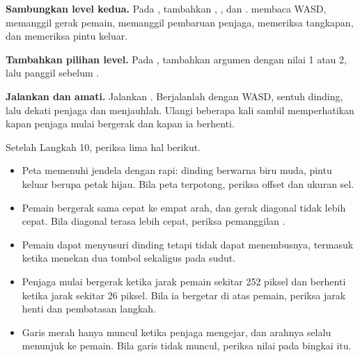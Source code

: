 \begin{langkah}
  \item \textbf{Sambungkan level kedua.} Pada , tambahkan
        , , dan .
         membaca WASD, memanggil gerak pemain, memanggil
        pembaruan penjaga, memeriksa tangkapan, dan memeriksa pintu keluar.

  \item \textbf{Tambahkan pilihan level.} Pada , tambahkan
        argumen  dengan nilai 1 atau 2, lalu panggil
         sebelum .

  \item \textbf{Jalankan dan amati.} Jalankan
        . Berjalanlah dengan WASD, sentuh dinding,
        lalu dekati penjaga dan menjauhlah. Ulangi beberapa kali sambil
        memperhatikan kapan penjaga mulai bergerak dan kapan ia berhenti.
\end{langkah}

\begin{ujibox}
Setelah Langkah 10, periksa lima hal berikut.
\begin{itemize}[leftmargin=1.4em, itemsep=0.2em]
  \item Peta memenuhi jendela dengan rapi: dinding berwarna biru muda, pintu
        keluar berupa petak hijau. Bila peta terpotong, periksa offset dan
        ukuran sel.
  \item Pemain bergerak sama cepat ke empat arah, dan gerak diagonal tidak
        lebih cepat. Bila diagonal terasa lebih cepat, periksa pemanggilan
        .
  \item Pemain dapat menyusuri dinding tetapi tidak dapat menembusnya, termasuk
        ketika menekan dua tombol sekaligus pada sudut.
  \item Penjaga mulai bergerak ketika jarak pemain sekitar 252 piksel dan
        berhenti ketika jarak sekitar 26 piksel. Bila ia bergetar di atas
        pemain, periksa jarak henti dan pembatasan langkah.
  \item Garis merah hanya muncul ketika penjaga mengejar, dan arahnya selalu
        menunjuk ke pemain. Bila garis tidak muncul, periksa nilai
         pada bingkai itu.
\end{itemize}
\end{ujibox}



